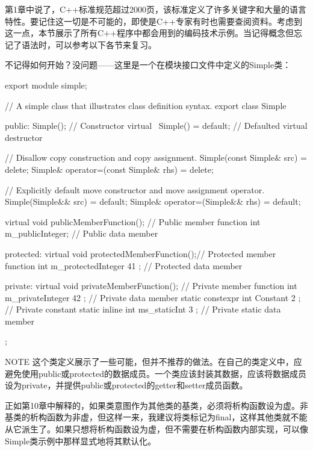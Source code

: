 
第1章中说了，C++标准规范超过2000页，该标准定义了许多关键字和大量的语言特性。要记住这一切是不可能的，即使是C++专家有时也需要查阅资料。考虑到这一点，本节展示了所有C++程序中都会用到的编码技术示例。当记得概念但忘记了语法时，可以参考以下各节来复习。


不记得如何开始？没问题——这里是一个在模块接口文件中定义的Simple类：

\begin{cpp}
export module simple;

// A simple class that illustrates class definition syntax.
export class Simple
{
    public:
        Simple(); // Constructor
        virtual ~Simple() = default; // Defaulted virtual destructor

        // Disallow copy construction and copy assignment.
        Simple(const Simple& src) = delete;
        Simple& operator=(const Simple& rhs) = delete;

        // Explicitly default move constructor and move assignment operator.
        Simple(Simple&& src) = default;
        Simple& operator=(Simple&& rhs) = default;

        virtual void publicMemberFunction(); // Public member function
        int m_publicInteger; // Public data member

    protected:
        virtual void protectedMemberFunction();// Protected member function
        int m_protectedInteger { 41 }; // Protected data member

    private:
        virtual void privateMemberFunction(); // Private member function
        int m_privateInteger { 42 }; // Private data member
        static constexpr int Constant { 2 }; // Private constant
        static inline int ms_staticInt { 3 }; // Private static data member
};
\end{cpp}

\begin{myNotic}{NOTE}
这个类定义展示了一些可能，但并不推荐的做法。在自己的类定义中，应避免使用public或protected的数据成员。一个类应该封装其数据，应该将数据成员设为private，并提供public或protected的getter和setter成员函数。
\end{myNotic}

正如第10章中解释的，如果类意图作为其他类的基类，必须将析构函数设为虚。非基类的析构函数为非虚，但这样一来，我建议将类标记为final，这样其他类就不能从它派生了。如果只想将析构函数设为虚，但不需要在析构函数内部实现，可以像Simple类示例中那样显式地将其默认化。

